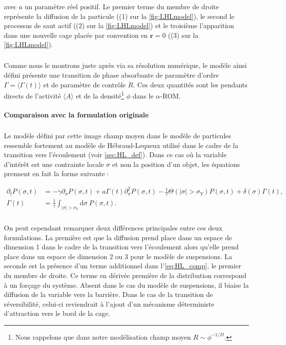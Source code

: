 \noindent avec $a$ un paramètre réel positif. Le premier terme du membre de droite représente la diffusion de la particule ((1) sur la \autoref{fig:LHLmodel}), le second le processus de saut actif ((2) sur la \autoref{fig:LHLmodel}) et le troisième l'apparition dans une nouvelle cage placée par convention en $\mathbf{r}=0$ ((3) sur la \autoref{fig:LHLmodel}). 

\subparagraph{}Comme nous le montrons juste après via sa résolution numérique, le modèle ainsi défini présente une transition de phase absorbante de paramètre d'ordre $\Gamma = \langle \Gamma (t) \rangle$ et de paramètre de contrôle $R$. Ces deux quantités sont les pendants directs de l'activité $\langle A \rangle$ et de la densité\footnote{Nous rappelons que dans notre modélisation champ moyen $R\sim \phi^{-1/D}$.} $\phi$ dans le $\alpha$-ROM.


\paragraph{Comparaison avec la formulation originale}

\subparagraph{}Le modèle défini par cette image champ moyen dans le modèle de particules ressemble fortement au modèle de Hébraud-Lequeux utilisé dans le cadre de la transition vers l'écoulement (voir \autoref{sec:HL_def}). Dans ce cas où la variable d'intérêt est une contrainte locale $\sigma$ et non la position d'un objet, les équations prennent en fait la forme suivante :

\begin{equation}
\begin{aligned}
    \partial_t P(\sigma, t) &= -\dot{\gamma}\partial_\sigma P(\sigma, t)+a\Gamma (t)\partial_\sigma^2 P(\sigma, t) - \frac{1}{\tau}\Theta(|\sigma|>\sigma_Y)P(\sigma, t) + \delta(\sigma)\Gamma (t),\\
    \Gamma (t) &= \frac{1}{\tau}\int_{|\sigma|>\sigma_Y}\mathrm{d}\sigma~P(\sigma, t).
\end{aligned}
\label{eq:HL_comp}
\end{equation} 

\subparagraph{} On peut cependant remarquer deux différences principales entre ces deux formulations. La première est que la diffusion prend place dans un espace de dimension 1 dans le cadre de la transition vers l'écoulement alors qu'elle prend place dans un espace de dimension 2 ou 3 pour le modèle de suspensions. La seconde est la présence d'un terme additionnel dans l'\autoref{eq:HL_comp}, le premier du membre de droite. Ce terme en dérivée première de la distribution correspond à un forçage du système. Absent dans le cas du modèle de suspensions, il biaise la diffusion de la variable vers la barrière. Dans le cas de la transition de réversibilité, celui-ci reviendrait à l'ajout d'un mécanisme déterministe d'attraction vers le bord de la cage.

